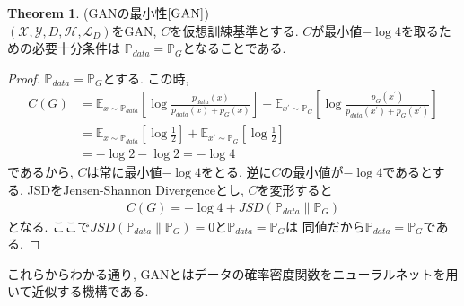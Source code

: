 \documentclass[11pt, a4paper, dvipdfmx]{jsarticle}
\theoremstyle{definition}
\newtheorem{Theorem+}[Axiom+]{Theorem}
\newcommand{\X}{\mathcal{X}}
\newcommand{\Y}{\mathcal{Y}}
\newcommand{\Hil}{\mathcal{H}}
\newcommand{\Loss}{\mathcal{L}_{D}}
\newcommand{\MLsp}{(\X, \Y, D, \Hil, \Loss)}
\begin{document}
\begin{Theorem+}(GANの最小性$\cite{GAN}$)\\
    $\MLsp$をGAN, $C$を仮想訓練基準とする. $C$が最小値$-\log4$を取るための必要十分条件は
    $\mathbb{P}_{data} = \mathbb{P}_{G}$となることである.
    \begin{proof}
        $\mathbb{P}_{data} = \mathbb{P}_{G}$とする. この時, 
        \begin{align*}
            C(G) &= \mathbb{E}_{x\sim\mathbb{P}_{data}}\left[ \log\frac{p_{data}(x)}{p_{data}(x) + p_{G}(x)} \right] + \mathbb{E}_{x^{\prime}\sim\mathbb{P}_{G}}\left[ \log\frac{p_{G}(x^{\prime})}{p_{data}(x^{\prime}) + p_{G}(x^{\prime})} \right]\\
                 &= \mathbb{E}_{x\sim\mathbb{P}_{data}}\left[ \log\frac{1}{2} \right] + \mathbb{E}_{x^{\prime}\sim\mathbb{P}_{G}}\left[ \log\frac{1}{2} \right]\\
                 &= -\log2 -\log2 = -\log4
        \end{align*}
        であるから, $C$は常に最小値$-\log4$をとる. 逆に$C$の最小値が$-\log4$であるとする. JSDをJensen-Shannon Divergenceとし, $C$を変形すると
        \begin{align*}
            C(G) = -\log4 + JSD\left(\mathbb{P}_{data}\|\mathbb{P}_{G}\right)
        \end{align*}
        となる. ここで$JSD\left(\mathbb{P}_{data}\|\mathbb{P}_{G}\right) = 0$と$\mathbb{P}_{data}=\mathbb{P}_{G}$は
        同値だから$\mathbb{P}_{data}=\mathbb{P}_{G}$である. 
    \end{proof}
\end{Theorem+}
これらからわかる通り, GANとはデータの確率密度関数をニューラルネットを用いて近似する機構である. 
\end{document}
